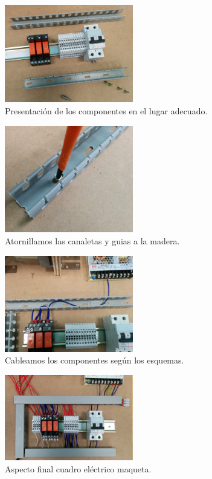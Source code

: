     \begin{figure}[H]
            \centering
            \includegraphics[width=0.5\textwidth]{images/maqueta/IMG_20150324_162200.jpg}
            \caption{Presentación de los componentes en el lugar adecuado.}
            \label{fig:maque_montaje5}
    \end{figure}
    \begin{figure}[H]
            \centering
            \includegraphics[width=0.5\textwidth]{images/maqueta/IMG_20150324_162705.jpg}
            \caption{Atornillamos las canaletas y guias a la madera.}
            \label{fig:maque_montaje6}
    \end{figure}
    \begin{figure}[H]
            \centering
            \includegraphics[width=0.5\textwidth]{images/maqueta/IMG_20150324_173716.jpg}
            \caption{Cableamos los componentes según los esquemas.}
            \label{fig:maque_montaje7}
    \end{figure}
    \begin{figure}[H]
            \centering
            \includegraphics[width=0.5\textwidth]{images/maqueta/IMG_20150331_125243.jpg}
            \caption{Aspecto final cuadro eléctrico maqueta.}
            \label{fig:maque_montaje8}
    \end{figure}
